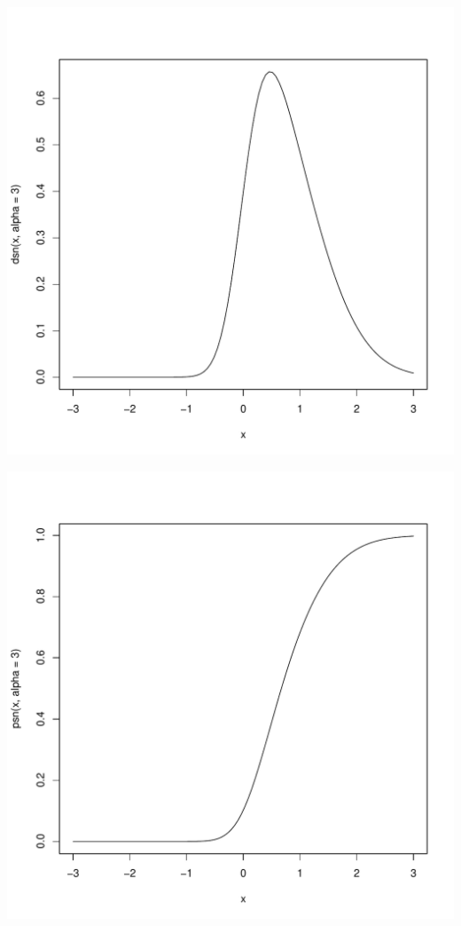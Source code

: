 \documentclass{article}\usepackage[]{graphicx}\usepackage[]{color}
\makeatletter
\def\maxwidth{ %
  \ifdim\Gin@nat@width>\linewidth
    \linewidth
  \else
    \Gin@nat@width
  \fi
}
\newenvironment{knitrout}{}{} %
\makeatother
\begin{document}
\begin{knitrout}
\color{fgcolor}
\includegraphics[width=\maxwidth]{figure/unnamed-chunk-12-1} 

\includegraphics[width=\maxwidth]{figure/unnamed-chunk-12-2} 


\end{knitrout}
\end{document}
